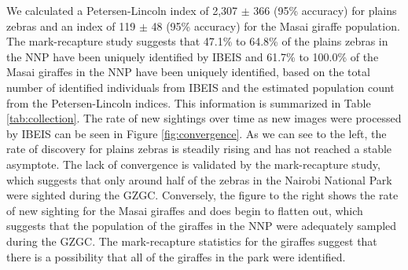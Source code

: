 We calculated a Petersen-Lincoln index of 2,307 $\pm$ 366 (95\% accuracy) for plains zebras and an index of 119 $\pm$ 48 (95\% accuracy) for the Masai giraffe population.  The mark-recapture study suggests that 47.1\% to 64.8\% of the  plains zebras in the NNP have been uniquely identified by IBEIS and 61.7\% to 100.0\% of the Masai giraffes in the NNP have been uniquely identified, based on the total number of identified individuals from IBEIS and the estimated population count from the Petersen-Lincoln indices.  This information is summarized in Table \ref{tab:collection}.  The rate of new sightings over time as new images were processed by IBEIS can be seen in Figure \ref{fig:convergence}.  As we can see to the left, the rate of discovery for plains zebras is steadily rising and has not reached a stable asymptote.  The lack of convergence is validated by the mark-recapture study, which suggests that only around half of the zebras in the Nairobi National Park were sighted during the GZGC.  Conversely, the figure to the right shows the rate of new sighting for the Masai giraffes and does begin to flatten out, which suggests that the population of the giraffes in the NNP were adequately sampled during the GZGC.  The mark-recapture statistics for the giraffes suggest that there is a possibility that all of the giraffes in the park were identified.

